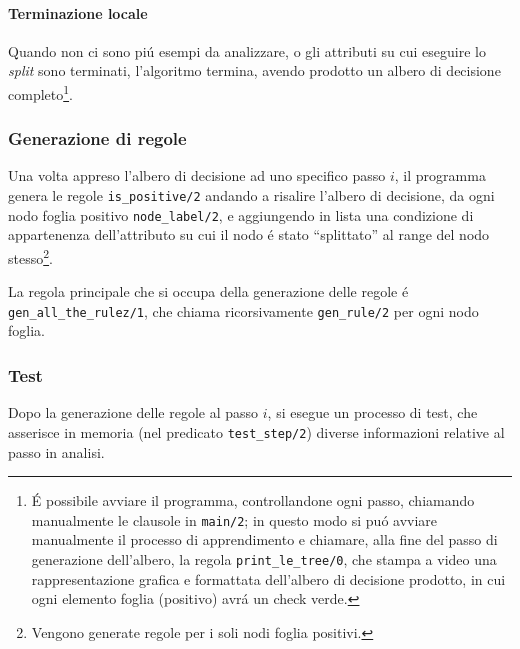 \documentclass[preprint]{acm_proc_article-sp}
\begin{document}
\paragraph{Terminazione locale}
Quando non ci sono pi\'u esempi da analizzare, o gli attributi su cui eseguire lo \textit{split} sono terminati, l'algoritmo termina, avendo prodotto un albero di decisione completo\footnote{\'E possibile avviare il programma, controllandone ogni passo, chiamando manualmente le clausole in \verb|main/2|; in questo modo si pu\'o avviare manualmente il processo di apprendimento e chiamare, alla fine del passo di generazione dell'albero, la regola \verb|print_le_tree/0|, che stampa a video una rappresentazione grafica e formattata dell'albero di decisione prodotto, in cui ogni elemento foglia (positivo) avr\'a un check verde.}.

\subsubsection{Generazione di regole}
Una volta appreso l'albero di decisione ad uno specifico passo $i$, il programma genera le regole \verb|is_positive/2| andando a risalire l'albero di decisione, da ogni nodo foglia positivo \verb|node_label/2|, e aggiungendo in lista una condizione di appartenenza dell'attributo su cui il nodo \'e stato ``splittato'' al range del nodo stesso\footnote{Vengono generate regole per i soli nodi foglia positivi.}.

La regola principale che si occupa della generazione delle regole \'e \verb|gen_all_the_rulez/1|, che chiama ricorsivamente \verb|gen_rule/2| per ogni nodo foglia.

\subsubsection{Test}
Dopo la generazione delle regole al passo $i$, si esegue un processo di test, che asserisce in memoria (nel predicato \verb|test_step/2|) diverse informazioni relative al passo in analisi.
\end{document}
